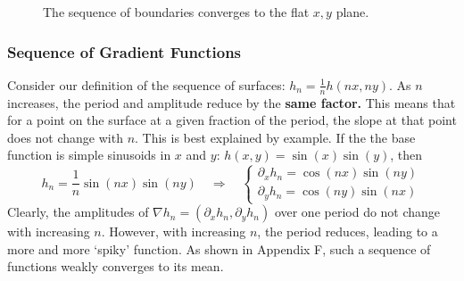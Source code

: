 \documentclass[12pt, a4paper, twoside, openright]{book}
\begin{document}
\begin{figure}[ht]
\centering
{}
\caption{The sequence of boundaries converges to the flat $x,y$ plane.}\label{boundseq}
\end{figure}


\subsubsection{Sequence of Gradient Functions}

Consider our definition of the sequence of surfaces: $ h_n = \frac{1}{n} h(nx, ny) $.
As $n$ increases, the period and amplitude reduce by the \textbf{same factor.}  This means that for a point on the surface at a given fraction of the period, the slope at that point does not change with $n$. 
This is best explained by example.  If the the base function is simple sinusoids in $x$ and $y$: $h(x,y) = \sin(x)\sin(y)$, then
\begin{equation}
h_n = \frac{1}{n} \sin(nx)\sin(ny) \quad \Rightarrow \quad
\begin{cases}
\partial_x h_n = \cos(nx)\sin(ny) \\ \partial_y h_n = \cos(ny)\sin(nx)
\end{cases}
\label{eq:slopeconstant}
\end{equation}
Clearly, the amplitudes of $\nabla h_n = (\partial_x h_n, \partial_y h_n)$ over one period do not change with increasing $n$.  However, with increasing $n$, the period reduces, leading to a more and more `spiky' function.
As shown in Appendix F, such a sequence of functions weakly converges to its mean.

\end{document}
